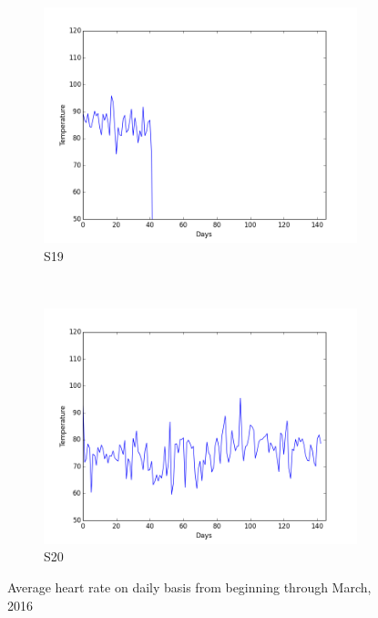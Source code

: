 \documentclass[12pt]{article} %
\begin{document}
\begin{figure}[H]
    \begin{subfigure}[b]{0.2\textwidth}
        \includegraphics[width=\textwidth]{img/graphs/19-heartrate-1}
        \caption{S19}
        \label{fig:s19HT}
    \end{subfigure}
    ~ %
    \begin{subfigure}[b]{0.2\textwidth}
        \includegraphics[width=\textwidth]{img/graphs/20-heartrate-1}
        \caption{S20}
        \label{fig:s20HT}
    \end{subfigure}
    \caption{Average heart rate on daily basis from beginning through March, 2016}
    \label{fig:avgheartrate}
\end{figure}
\end{document}
